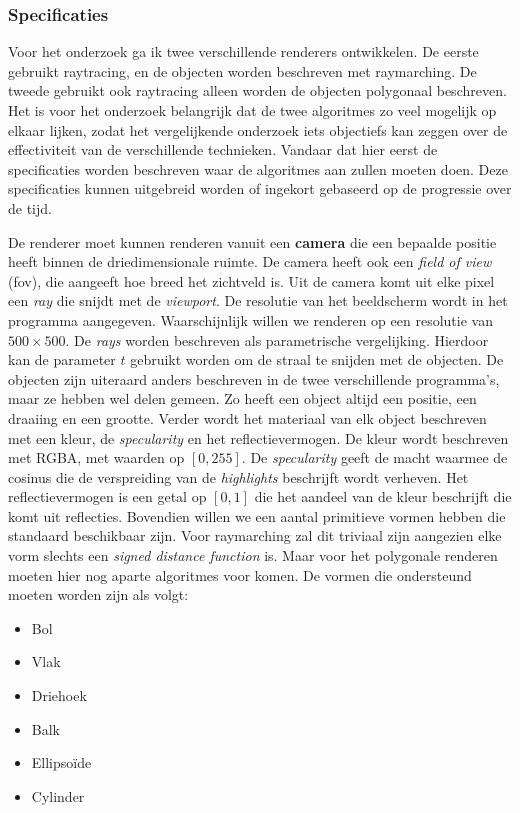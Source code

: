 \documentclass[12pt, a4paper]{article}
\begin{document}
\subsubsection{Specificaties}
Voor het onderzoek ga ik twee verschillende renderers ontwikkelen. De eerste gebruikt raytracing, en de objecten worden beschreven met raymarching. De tweede gebruikt ook raytracing alleen worden de objecten polygonaal beschreven. Het is voor het onderzoek belangrijk dat de twee algoritmes zo veel mogelijk op elkaar lijken, zodat het vergelijkende onderzoek iets objectiefs kan zeggen over de effectiviteit van de verschillende technieken. Vandaar dat hier eerst de specificaties worden beschreven waar de algoritmes aan zullen moeten doen. Deze specificaties kunnen uitgebreid worden of ingekort gebaseerd op de progressie over de tijd.

De renderer moet kunnen renderen vanuit een \textbf{camera} die een bepaalde positie heeft binnen de driedimensionale ruimte. De camera heeft ook een \emph{field of view} (fov), die aangeeft hoe breed het zichtveld is. Uit de camera komt uit elke pixel een \emph{ray} die snijdt met de \emph{viewport}. De resolutie van het beeldscherm wordt in het programma aangegeven. Waarschijnlijk willen we renderen op een resolutie van \(500\times 500\). De \emph{rays} worden beschreven als parametrische vergelijking. Hierdoor kan de parameter \(t\) gebruikt worden om de straal te snijden met de objecten. De objecten zijn uiteraard anders beschreven in de twee verschillende programma's, maar ze hebben wel delen gemeen. Zo heeft een object altijd een positie, een draaiing en een grootte. Verder wordt het materiaal van elk object beschreven met een kleur, de \emph{specularity} en het reflectievermogen. De kleur wordt beschreven met RGBA, met waarden op \([0, 255]\). De \emph{specularity} geeft de macht waarmee de cosinus die de verspreiding van de \emph{highlights} beschrijft wordt verheven. Het reflectievermogen is een getal op \([0, 1]\) die het aandeel van de kleur beschrijft die komt uit reflecties. Bovendien willen we een aantal primitieve vormen hebben die standaard beschikbaar zijn. Voor raymarching zal dit triviaal zijn aangezien elke vorm slechts een \emph{signed distance function} is. Maar voor het polygonale renderen moeten hier nog aparte algoritmes voor komen. De vormen die ondersteund moeten worden zijn als volgt:
\begin{itemize}
	\item Bol
	\item Vlak
	\item Driehoek
	\item Balk
	\item Ellipsoïde
	\item Cylinder
\end{itemize}
\end{document}
